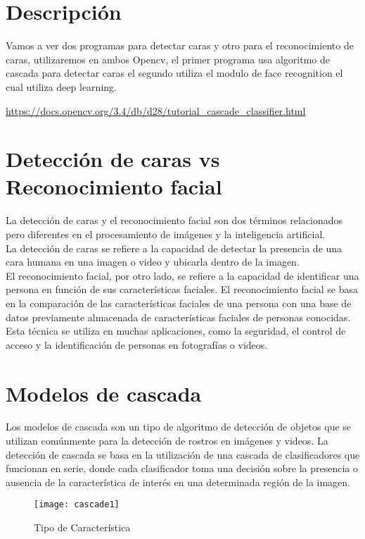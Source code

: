 \section{Descripción}
Vamos a ver dos programas para detectar caras y otro para el reconocimiento de caras,
utilizaremos en ambos Opencv, el primer programa usa algoritmo de cascada para 
detectar caras
el segundo utiliza el modulo de face recognition el cual utiliza deep learning.

\url{https://docs.opencv.org/3.4/db/d28/tutorial_cascade_classifier.html}
\section{ Detección de caras vs Reconocimiento facial}

La detección de caras y el reconocimiento facial son dos términos relacionados 
pero diferentes en el procesamiento de imágenes y la inteligencia artificial.\\

La detección de caras se refiere a la capacidad de detectar la presencia de una 
cara humana en una imagen o video y ubicarla dentro de la imagen. \\

El reconocimiento facial, por otro lado, se refiere a la capacidad de identificar 
una persona en función de sus características faciales. El reconocimiento facial se 
basa en la comparación de las características faciales de una persona con una base 
de datos previamente almacenada de características faciales de personas conocidas.\\

Esta técnica se utiliza en muchas aplicaciones, como la seguridad, el control 
de acceso y la identificación de personas en fotografías o videos.

\section{Modelos de cascada}
Los modelos de cascada son un tipo de algoritmo de detección de objetos que se 
utilizan comúnmente para la detección de rostros en imágenes y videos. 
La detección de cascada se basa en la utilización de una cascada de 
clasificadores que funcionan en serie, donde cada clasificador toma una 
decisión sobre la presencia o ausencia de la característica de interés en una
 determinada región de la imagen.

\begin{figure}[H]
  \centering
  \texttt{[image: cascade1]}
  \caption{Tipo de Característica}\label{fig:característica}
\end{figure}

